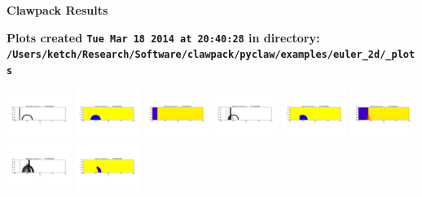 \documentclass[11pt]{article}
\begin{document}
        \begin{center}{\Large\bf Clawpack Results}\vskip 5pt
        
        \bf Plots created {\tt Tue Mar 18 2014 at 20:40:28} in directory: \vskip 5pt
        \verb+/Users/ketch/Research/Software/clawpack/pyclaw/examples/euler_2d/_plots+
        \end{center}
        \vskip 5pt
        \includegraphics[width=0.158333333333\textwidth]{frame0000fig0.png}
\includegraphics[width=0.158333333333\textwidth]{frame0000fig1.png}
\includegraphics[width=0.158333333333\textwidth]{frame0000fig2.png}
\includegraphics[width=0.158333333333\textwidth]{frame0001fig0.png}
\includegraphics[width=0.158333333333\textwidth]{frame0001fig1.png}
\includegraphics[width=0.158333333333\textwidth]{frame0001fig2.png}
\vskip 10pt 
\includegraphics[width=0.158333333333\textwidth]{frame0002fig0.png}
\includegraphics[width=0.158333333333\textwidth]{frame0002fig1.png}
\end{document}

